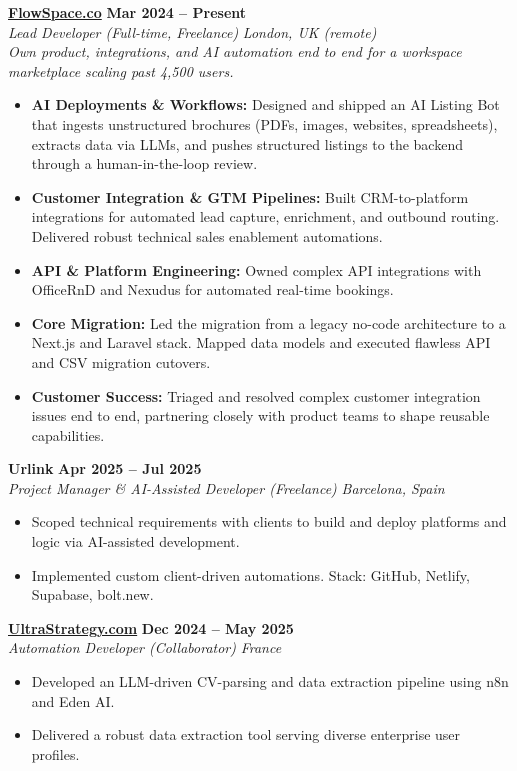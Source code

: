 \documentclass[a4paper,10pt]{article}
\newcommand{\role}[4]{%
 \textbf{#1} \hfill \textbf{#2}\\[1pt]%
 \textit{#3} \hfill \textit{#4}\\[2pt]%
}
\begin{document}
\role{\href{https://flowspace.co}{FlowSpace.co}}{Mar 2024 -- Present}{Lead Developer (Full-time, Freelance)}{London, UK (remote)}
\textit{Own product, integrations, and AI automation end to end for a workspace marketplace scaling past 4,500 users.}
\begin{itemize}
 \item \textbf{AI Deployments \& Workflows:} Designed and shipped an AI Listing Bot that ingests unstructured brochures (PDFs, images, websites, spreadsheets), extracts data via LLMs, and pushes structured listings to the backend through a human-in-the-loop review.
 \item \textbf{Customer Integration \& GTM Pipelines:} Built CRM-to-platform integrations for automated lead capture, enrichment, and outbound routing. Delivered robust technical sales enablement automations.
 \item \textbf{API \& Platform Engineering:} Owned complex API integrations with OfficeRnD and Nexudus for automated real-time bookings. 
 \item \textbf{Core Migration:} Led the migration from a legacy no-code architecture to a Next.js and Laravel stack. Mapped data models and executed flawless API and CSV migration cutovers.
 \item \textbf{Customer Success:} Triaged and resolved complex customer integration issues end to end, partnering closely with product teams to shape reusable capabilities.
\end{itemize}

\role{Urlink}{Apr 2025 -- Jul 2025}{Project Manager \& AI-Assisted Developer (Freelance)}{Barcelona, Spain}
\begin{itemize}
 \item Scoped technical requirements with clients to build and deploy platforms and logic via AI-assisted development.
 \item Implemented custom client-driven automations. Stack: GitHub, Netlify, Supabase, bolt.new.
\end{itemize}

\role{\href{https://ultrastrategy.com}{UltraStrategy.com}}{Dec 2024 -- May 2025}{Automation Developer (Collaborator)}{France}
\begin{itemize}
 \item Developed an LLM-driven CV-parsing and data extraction pipeline using n8n and Eden AI.
 \item Delivered a robust data extraction tool serving diverse enterprise user profiles.
\end{itemize}
\end{document}
